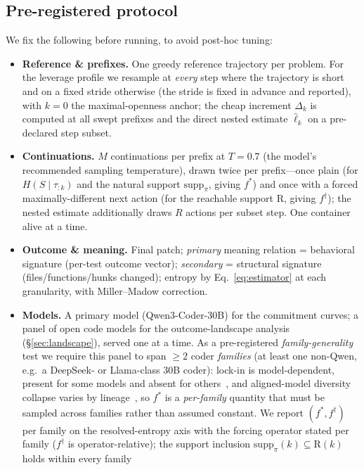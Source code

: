 \documentclass[11pt]{article}
\newcommand{\strat}{S}
\begin{document}
\subsection{Pre-registered protocol}
\label{sec:protocol}
We fix the following before running, to avoid post-hoc tuning:
\begin{itemize}[leftmargin=1.4em,itemsep=2pt,topsep=2pt]
\item \textbf{Reference \& prefixes.} One greedy reference trajectory per problem.
For the leverage profile we resample at \emph{every} step where the trajectory is
short and on a fixed stride otherwise (the stride is fixed in advance and reported),
with $k\!=\!0$ the maximal-openness anchor; the cheap increment $\Delta_k$ is
computed at all swept prefixes and the direct nested estimate $\widehat\ell_k$ on a
pre-declared step subset.
\item \textbf{Continuations.} $M$ continuations per prefix at $T=0.7$ (the
model's recommended sampling temperature), drawn twice per prefix---once plain (for
$H(\strat\mid\tau_{:k})$ and the natural support $\mathrm{supp}_\pi$, giving
$f^\ast$) and once with a forced maximally-different next action (for the reachable
support $\mathrm{R}$, giving $f^\dagger$); the nested estimate additionally draws $R$
actions per subset step. One container alive at a time.
\item \textbf{Outcome \& meaning.} Final patch; \emph{primary} meaning relation =
behavioral signature (per-test outcome vector); \emph{secondary} = structural
signature (files/functions/hunks changed); entropy by Eq.~\eqref{eq:estimator} at
each granularity, with Miller--Madow correction.
\item \textbf{Models.} A primary model (Qwen3-Coder-30B) for the commitment curves;
a panel of open code models for the outcome-landscape analysis
(\S\ref{sec:landscape}), served one at a time. As a pre-registered
\emph{family-generality} test we require this panel to span $\geq\!2$ coder
\emph{families} (at least one non-Qwen, e.g.\ a DeepSeek- or Llama-class 30B coder):
lock-in is model-dependent, present for some models and absent for
others~\citep{entropydynamics2026}, and aligned-model diversity collapse varies by
lineage~\citep{diversitycollapse2025,zhang2025noveltybench}, so $f^\ast$ is a
\emph{per-family} quantity that must be sampled across families rather than assumed
constant. We report $(f^\ast,f^\dagger)$ per family on the resolved-entropy axis with
the forcing operator stated per family ($f^\dagger$ is operator-relative); the support
inclusion $\mathrm{supp}_\pi(k)\subseteq\mathrm{R}(k)$ holds within every family

\end{itemize}
\end{document}
